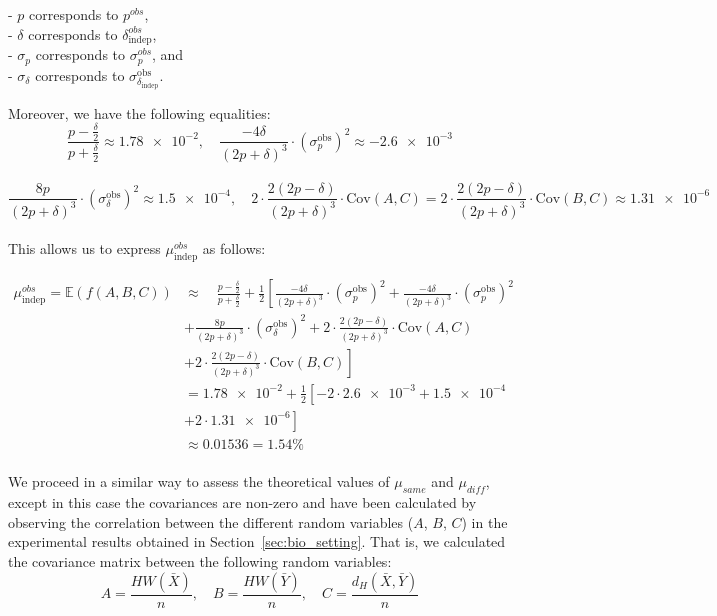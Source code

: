 - \(p\) corresponds to \(p^{obs}\),\\
- \(\delta\) corresponds to \(\delta_{\text{indep}}^{obs}\),\\
- \(\sigma_p\) corresponds to \(\sigma_p^{obs}\), and\\
- \(\sigma_\delta\) corresponds to \(\sigma_{\delta_{\text{indep}}}^{\text{obs}}\).

Moreover, we have the following equalities:
 \[
    \frac{p - \frac{\delta}{2}}{p + \frac{\delta}{2}} \approx \num{1.78e-2}, \quad \frac{-4\delta}{(2p + \delta)^3}\cdot({\sigma^\text{obs}_p})^2 \approx -\num{2.6e-3}
 \]\\
 \[
    \frac{8p}{(2p + \delta)^3}\cdot({\sigma^\text{obs}_\delta})^2 \approx \num{1.5e-4}, \quad  2\cdot\frac{2(2p - \delta)}{(2p + \delta)^3}\cdot\text{Cov}(A,C) = 2\cdot\frac{2(2p - \delta)}{(2p + \delta)^3}\cdot\text{Cov}(B,C) \approx \num{1.31e-6}
 \]\\

This allows us to express \( \mu_{\text{indep}}^{obs} \) as follows:

\begin{equation}
    \begin{aligned}
    \mu_{\text{indep}}^{obs} = \mathbb{E}(f(A,B,C)) &\approx \quad \frac{p - \frac{\delta}{2}}{p + \frac{\delta}{2}} + \frac{1}{2} \left[ \frac{-4\delta}{(2p + \delta)^3}\cdot({\sigma^\text{obs}_p})^2 + \frac{-4\delta}{(2p + \delta)^3}\cdot({\sigma^\text{obs}_p})^2 \right. \\[2mm]
    & \left. + \frac{8p}{(2p + \delta)^3}\cdot({\sigma^\text{obs}_\delta})^2 + 2\cdot\frac{2(2p - \delta)}{(2p + \delta)^3}\cdot\text{Cov}(A,C) \right. \\[2mm]
    & \left. + 2\cdot\frac{2(2p - \delta)}{(2p + \delta)^3}\cdot\text{Cov}(B,C) \right]\\[6mm]
    & = \num{1.78e-2} + \frac{1}{2} \left[ -2\cdot\num{2.6e-3} + \num{1.5e-4}  \right. \\[2mm]
    & \left. + 2\cdot\num{1.31e-6} \right] \\[6mm]
    & \approx 0.01536 = 1.54\%
    \end{aligned}
    \label{eq:mu_indep}
\end{equation}\\

We proceed in a similar way to assess the theoretical values of $\mu_{same}$ and $\mu_{diff}$, except in this case the covariances are non-zero and have been calculated by observing the correlation between the different random variables (\(A\), \(B\), \(C\)) in the experimental results obtained in Section~\ref{sec:bio_setting}. That is, we calculated the covariance matrix between the following random variables:
\[
A = \frac{HW(\bar{X})}{n}, \quad B = \frac{HW(\bar{Y})}{n}, \quad C = \frac{d_H(\bar{X}, \bar{Y})}{n}
\]

